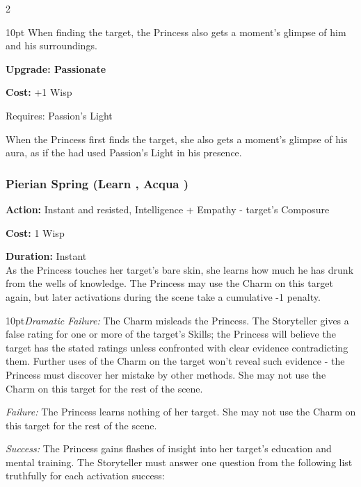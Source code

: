 \begin{multicols}{2}
\begin{myindentpar}{10pt}
When finding the target, the Princess also gets a moment's glimpse of him and his surroundings.

\textbf{Upgrade: Passionate}

\noindent \textbf{Cost:} +1 Wisp

Requires: Passion's Light

When the Princess first finds the target, she also gets a moment's glimpse of his aura, as if the had used Passion's Light in his presence. \end{myindentpar}

\subsubsection*{Pierian Spring (Learn \textbullet\textbullet, Acqua \textbullet)}

\noindent \textbf{Action:} Instant and resisted, Intelligence + Empathy - target's Composure

\noindent \textbf{Cost:} 1 Wisp

\noindent \textbf{Duration:} Instant \\

\noindent As the Princess touches her target's bare skin, she learns how much he has drunk from the wells of knowledge. The Princess may use the Charm on this target again, but later activations during the scene take a cumulative -1 penalty.


\begin{myindentpar}{10pt}\emph{Dramatic Failure:} The Charm misleads the Princess. The Storyteller gives a false rating for one or more of the target's Skills; the Princess will believe the target has the stated ratings unless confronted with clear evidence contradicting them. Further uses of the Charm on the target won't reveal such evidence - the Princess must discover her mistake by other methods. She may not use the Charm on this target for the rest of the scene.

\emph{Failure:} The Princess learns nothing of her target. She may not use the Charm on this target for the rest of the scene.

\emph{Success:} The Princess gains flashes of insight into her target's education and mental training. The Storyteller must answer one question from the following list truthfully for each activation success:


\end{myindentpar}
\end{multicols}
